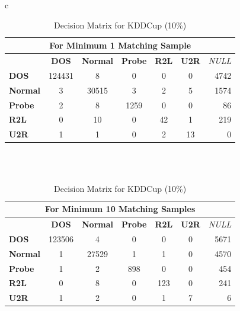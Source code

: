 \documentclass[pdflatex,sn-mathphys-num]{sn-jnl}%
\let\oldcaption\caption
\renewcommand{\caption}[1]{\oldcaption{\centering #1}}
\theoremstyle{thmstyleone}%
\theoremstyle{thmstyletwo}%
\theoremstyle{thmstylethree}%
\begin{document}
\begin{table}[ht!]
    \centering
    \caption{Decision Matrix for KDDCup (10\%)}
    \label{tab:KDDcup_Matrix}

    \begin{tabular}{c}

    \begin{tabular}{|l|c|c|c|c|c|r|}
        \hline
        \multicolumn{7}{|c|}{\textbf{For Minimum 1 Matching Sample}} \\ \hline
         & \textbf{DOS} & \textbf{Normal} & \textbf{Probe} & \textbf{R2L} & \textbf{U2R} & \textit{NULL} \\ \hline 
        \textbf{DOS} & 124431 & 8 & 0 & 0 & 0 & 4742 \\ \hline 
        \textbf{Normal} & 3 & 30515 & 3 & 2 & 5 & 1574 \\ \hline
        \textbf{Probe} & 2 & 8 & 1259 & 0 & 0 & 86 \\ \hline
        \textbf{R2L} & 0 & 10 & 0 & 42 & 1 & 219 \\ \hline
        \textbf{U2R} & 1 & 1 & 0 & 2 & 13 & 0 \\ \hline
    \end{tabular}

\\
\\
    \begin{tabular}{|l|c|c|c|c|c|r|}
        \hline
        \multicolumn{7}{|c|}{\textbf{For Minimum 10 Matching Samples}} \\ \hline
         & \textbf{DOS} & \textbf{Normal} & \textbf{Probe} & \textbf{R2L} & \textbf{U2R} & \textit{NULL} \\ \hline 
        \textbf{DOS} & 123506 & 4 & 0 & 0 & 0 & 5671 \\ \hline 
        \textbf{Normal} & 1 & 27529 & 1 & 1 & 0 & 4570 \\ \hline
        \textbf{Probe} & 1 & 2 & 898 & 0 & 0 & 454 \\ \hline
        \textbf{R2L} & 0 & 8 & 0 & 123 & 0 & 241 \\ \hline
        \textbf{U2R} & 1 & 2 & 0 & 1 & 7 & 6 \\ \hline
    \end{tabular}


\end{tabular}
\end{table}
\end{document}

